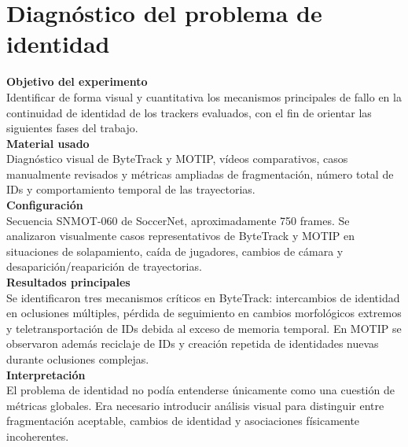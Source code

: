 \documentclass[../MAIN.tex]{subfiles}
\begin{document}
	
	
	\section{Diagnóstico del problema de identidad}
	
	
	\begin{chaptertemplatebox}
		\textbf{Objetivo del experimento}\\
		Identificar de forma visual y cuantitativa los mecanismos principales de fallo en la continuidad de identidad de los trackers evaluados, con el fin de orientar las siguientes fases del trabajo.\\[0.5em]
		
		\textbf{Material usado}\\
		Diagnóstico visual de ByteTrack y MOTIP, vídeos comparativos, casos manualmente revisados y métricas ampliadas de fragmentación, número total de IDs y comportamiento temporal de las trayectorias.\\[0.5em]
		
		\textbf{Configuración}\\
		Secuencia SNMOT-060 de SoccerNet, aproximadamente 750 frames. Se analizaron visualmente casos representativos de ByteTrack y MOTIP en situaciones de solapamiento, caída de jugadores, cambios de cámara y desaparición/reaparición de trayectorias.\\[0.5em]
		
		\textbf{Resultados principales}\\
		Se identificaron tres mecanismos críticos en ByteTrack: intercambios de identidad en oclusiones múltiples, pérdida de seguimiento en cambios morfológicos extremos y teletransportación de IDs debida al exceso de memoria temporal. En MOTIP se observaron además reciclaje de IDs y creación repetida de identidades nuevas durante oclusiones complejas.\\[0.5em]
		
		\textbf{Interpretación}\\
		El problema de identidad no podía entenderse únicamente como una cuestión de métricas globales. Era necesario introducir análisis visual para distinguir entre fragmentación aceptable, cambios de identidad y asociaciones físicamente incoherentes.\\[0.5em]
		

\end{chaptertemplatebox}
\end{document}
